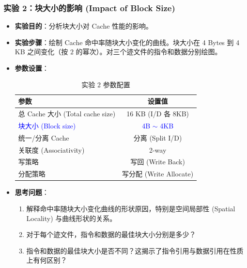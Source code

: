 \documentclass[12pt,a4paper]{article}
\begin{document}
\subsubsection{实验 2：块大小的影响 (Impact of Block Size)}
\begin{itemize}
    \item \textbf{实验目的}：分析块大小对 Cache 性能的影响。
    \item \textbf{实验步骤}：绘制 Cache 命中率随块大小变化的曲线。块大小在 4 Bytes 到 4 KB 之间变化（按 $2$ 的幂次）。对三个迹文件的指令和数据分别绘图。
    \item \textbf{参数设置}：
    
    \begin{table}[H]
    \centering
    \small
    \begin{tabular}{lc}
    \toprule
    \textbf{参数} & \textbf{设置值} \\
    \midrule
    总 Cache 大小 (Total cache size) & 16 KB (I/D 各 8KB) \\
    \textcolor{blue}{块大小 (Block size)} & \textcolor{blue}{4B $\sim$ 4KB} \\
    统一/分离 Cache & 分离 (Split I/D) \\
    关联度 (Associativity) & 2-way \\
    写策略 & 写回 (Write Back) \\
    分配策略 & 写分配 (Write Allocate) \\
    \bottomrule
    \end{tabular}
    \caption{实验 2 参数配置}
    \end{table}
    \item \textbf{思考问题}：
    \begin{enumerate}
        \item 解释命中率随块大小变化曲线的形状原因，特别是空间局部性 (Spatial Locality) 与曲线形状的关系。
        \item 对于每个迹文件，指令和数据的最佳块大小分别是多少？
        \item 指令和数据的最佳块大小是否不同？这揭示了指令引用与数据引用在性质上有何区别？
    \end{enumerate}
\end{itemize}
\end{document}
